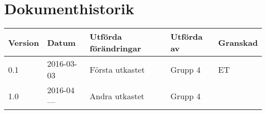 \documentclass[11pt]{article}
\begin{document}
\tableofcontents

\pagebreak
\section*{Dokumenthistorik}
\begin{table}[h]
\begin{tabular}{|l|l|l|l|l|} \hline

\textbf{Version} & \textbf{Datum} & \textbf{Utförda förändringar} & \textbf{Utförda av} & \textbf{Granskad} \\ \hline
0.1 & 2016-03-03 &  Första utkastet & Grupp 4 & ET \\ \hline
1.0 & 2016-04--- &  Andra utkastet & Grupp 4 & \\ \hline
\end{tabular}
\end{table}

\pagebreak
{}
\end{document}
